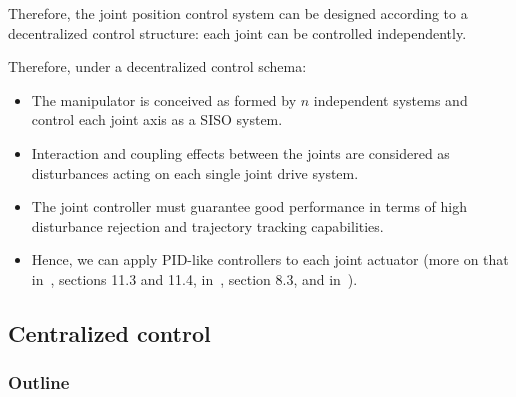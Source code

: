 \documentclass[10pt, aspectratio=169]{beamer}
\theoremstyle{remark}
\theoremstyle{definition}
\begin{document}
\begin{frame}[allowframebreaks]
    Therefore, the joint position control system can be designed according to a decentralized control structure: each joint can be controlled independently. 

    \framebreak

    Therefore, under a decentralized control schema:
    \begin{itemize}
        \item The manipulator is conceived as formed by $n$ independent systems and control each joint axis as a SISO system.
    
        \item Interaction and coupling effects between the joints are considered as disturbances acting on each single joint drive system.

        \item The joint controller must guarantee good performance in terms of high disturbance rejection and trajectory tracking capabilities.

        \item Hence, we can apply PID-like controllers to each joint actuator (more on that in~\cite{lynch2017modern}, sections 11.3 and 11.4, in~\cite{sciavicco2010robotics}, section 8.3, and in~\cite{corke_robot_joint_control}). 
    \end{itemize}
    
\end{frame}

\subsection{Centralized control}

\begin{frame}
	\frametitle{Outline} %
\end{frame}
\end{document}
